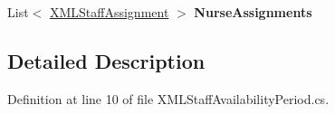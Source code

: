 \begin{DoxyCompactItemize}
\item 
List$<$ \hyperlink{class_general_health_care_elements_1_1_input_1_1_x_m_l_input_classes_1_1_x_m_l_staff_assignment}{X\+M\+L\+Staff\+Assignment} $>$ {\bfseries Nurse\+Assignments}\hypertarget{class_general_health_care_elements_1_1_input_1_1_x_m_l_input_classes_1_1_x_m_l_staff_availability_period_a7eea1cc9a1956a9e91c5da82e9bf0aa7}{}\label{class_general_health_care_elements_1_1_input_1_1_x_m_l_input_classes_1_1_x_m_l_staff_availability_period_a7eea1cc9a1956a9e91c5da82e9bf0aa7}

\end{DoxyCompactItemize}


\subsection{Detailed Description}


Definition at line 10 of file X\+M\+L\+Staff\+Availability\+Period.\+cs.

